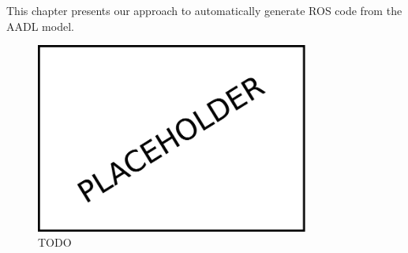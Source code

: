 This chapter presents our approach to automatically generate ROS code from the AADL model.

\minitoc
\newpage

\begin{figure}[t]
    \centering
    \includegraphics[width=0.8\textwidth]{gfx/placeholder}
    \caption{TODO}\label{fig:code-gen}
\end{figure}

